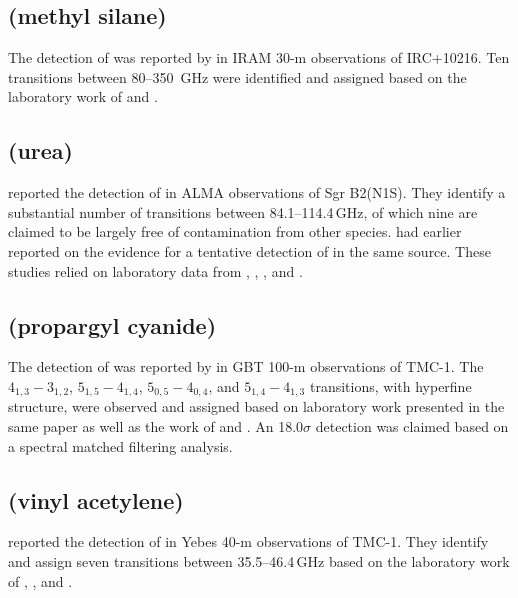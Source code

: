 \documentclass[twocolumn]{aastex631}
\newcommand{\update}[1]{{#1}}
\begin{document}
	\subsection{ (methyl silane)}
	\label{CH3SiH3}
	
	The detection of  was reported by \citet{Cernicharo:2017gc} in IRAM 30-m observations of IRC+10216.  Ten transitions between 80--350~GHz were identified and assigned based on the laboratory work of \citet{Meerts:1982fn} and \citet{Wong:1983iy}.
	
    \subsection{\update{ (urea)}}
    \label{NH2CONH2}
    
    \update{\citet{Belloche:2019hc} reported the detection of \ce{(NH2)CO} in ALMA observations of Sgr B2(N1S).  They identify a substantial number of transitions between 84.1--114.4\,GHz, of which nine are claimed to be largely free of contamination from other species.    \citet{Remijan:2014jb} had earlier reported on the evidence for a tentative detection of \ce{(NH2)2CO} in the same source. These studies {relied on} laboratory data from \citet{Brown:1975wo}, \citet{Kasten:1986fm}, \citet{Kretschmer:1996hf}, and \citet{Godfrey:1997wv}.}
    	
	\subsection{\update{ (propargyl cyanide)}}
	\label{HCCCH2CN}
	
	\update{The detection of  was reported by \citet{McGuire:2020bb} in GBT 100-m observations of TMC-1.  The $4_{1,3} - 3_{1,2}$, $5_{1,5} - 4_{1,4}$, $5_{0,5} - 4_{0,4}$, and $5_{1,4} - 4_{1,3}$ transitions, with hyperfine structure, were observed and assigned based on laboratory work presented in the same paper as well as the work of \citet{Jones:1982vg,Demaison:1985td,McNaughton:1988tk} and \citet{Jager:1990ty}.  An 18.0$\sigma$ detection was claimed based on a spectral matched filtering analysis.}
	
	\subsection{\update{ (vinyl acetylene)}}
	\label{CH2CHCCH}
	
	\update{\citet{Cernicharo:2021fk} reported the detection of \ce{CH2CHCCH} in Yebes 40-m observations of TMC-1.  {They identify and assign seven transitions between 35.5--46.4\,GHz} based on the laboratory work of \citet{Sobolev:1961od}, \citet{Thorwirth:2003id}, and \citet{Thorwirth:2004pd}.}
	
\end{document}
